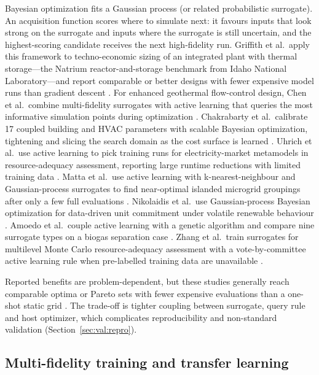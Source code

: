 Bayesian optimization fits a Gaussian process (or related probabilistic
surrogate). An acquisition function scores where to simulate next: it
favours inputs that look strong on the surrogate and inputs where the
surrogate is still uncertain, and the highest-scoring candidate receives
the next high-fidelity run. Griffith et al.\ apply this framework to
techno-economic sizing of an integrated plant with thermal storage---the
Natrium reactor-and-storage benchmark from Idaho National
Laboratory---and report comparable or better designs with fewer
expensive model runs than gradient descent \cite{Griffith2025}. For enhanced
geothermal flow-control design, Chen et al.\ combine multi-fidelity
surrogates with active learning that queries the most informative
simulation points during optimization \cite{Chen2025244}. Chakrabarty
et al.\ calibrate 17 coupled building and HVAC parameters with scalable
Bayesian optimization, tightening and slicing the search domain as the
cost surface is learned \cite{Chakrabarty2021}. Uhrich et al.\ use
active learning to pick training runs for electricity-market metamodels
in resource-adequacy assessment, reporting large runtime reductions
with limited training data \cite{Uhrich2026211}. Matta et al.\ use
active learning with k-nearest-neighbour and Gaussian-process
surrogates to find near-optimal islanded microgrid groupings after only
a few full evaluations \cite{Matta2026}. Nikolaidis et al.\ use
Gaussian-process Bayesian optimization for data-driven unit commitment
under volatile renewable behaviour \cite{Nikolaidis2021}. Amoedo et al.\
couple active learning with a genetic algorithm and compare nine
surrogate types on a biogas separation case \cite{Amoedo2023929}. Zhang
et al.\ train surrogates for multilevel Monte Carlo resource-adequacy
assessment with a vote-by-committee active learning rule when
pre-labelled training data are unavailable \cite{Zhang2025__6}.

Reported benefits are problem-dependent, but these studies generally
reach comparable optima or Pareto sets with fewer expensive evaluations
than a one-shot static grid \cite{Liu201914569,Matta2026,Granacher20221573}.
The trade-off is tighter coupling between surrogate, query rule and host
optimizer, which complicates reproducibility and non-standard validation
(Section~\ref{sec:val:repro}).

\subsection{Multi-fidelity training and transfer learning}
\label{sec:doe:multifidelity}

